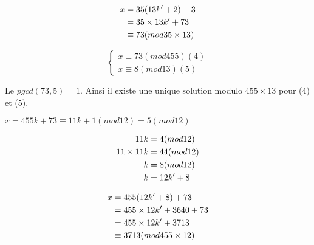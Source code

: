\documentclass[a4paper,10pt]{article}
\begin{document}
\begin{align}
	x &= 35(13k'+2)+3 \notag \\
	   &= 35 \times 13k' +73 \notag \\
	   &\equiv 73(mod 35 \times 13) \notag
\end{align}

\[
\left\{
\begin{aligned}	
	x \equiv 73(mod 455) (4)\\	
	x \equiv 8(mod 13) (5)
	\end{aligned}	
\right.\]

Le $pgcd(73,5)=1$. Ainsi il existe une unique solution modulo $455 \times 13 $ pour (4) et (5).

$x=455k +73 \equiv 11k + 1 (mod 12)=5 (mod 12)$

\begin{align}
	11k&=4(mod 12) \notag \\
	11 \times 11k &= 44 (mod 12) \notag \\	
	k &= 8 (mod 12) \notag \\
	k &= 12k' +8 \notag
\end{align}

\begin{align}
	x &= 455(12k'+8)+73 \notag \\
	   &= 455 \times 12k' + 3640 + 73 \notag \\
	   &= 455 \times 12k'+3713 \notag \\
	   &\equiv 3713 (mod 455 \times 12) \notag 
\end{align}
 
\end{document}
